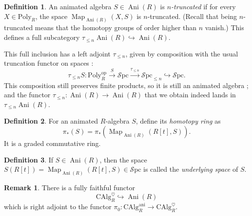 \documentclass[11pt]{article}
\theoremstyle{definition}
\newtheorem{definition}{Definition}
\newtheorem{remark}{Remark}
\newcommand{\Ani}{\operatorname{Ani}}
\newcommand{\ani}{\mathrm{ani}}
\newcommand{\CAlg}{\mathrm{CAlg}}
\newcommand{\heart}{\heartsuit}
\newcommand{\Map}{\operatorname{Map}}
\newcommand{\op}{\mathrm{op}}
\newcommand{\Poly}{\mathrm{Poly}}
\newcommand{\Spc}{\mathcal{S}\mathrm{pc}}
\begin{document}
\begin{definition}
    An animated algebra $S \in \Ani(R)$ is \emph{$n$-truncated} if for every $X \in \Poly_R$, the space $\Map_{\Ani(R)}(X, S)$ is $n$-truncated. (Recall that being $n$-truncated means that the homotopy groups of order higher than $n$ vanish.)
    This defines a full subcategory $\tau_{\leqslant n} \Ani(R) \hookrightarrow \Ani(R)$.
\end{definition}
This full inclusion has a left adjoint $\tau_{\leqslant n}$, given by composition with the usual truncation functor on spaces :
\[
    \tau_{\leqslant n} S : \Poly_R^{\op} \xrightarrow{S} \Spc \xrightarrow{\tau_{\leqslant n}} \Spc_{\leqslant n} \hookrightarrow \Spc.
\]
This composition still preserves finite products, so it is still an animated algebra ; and the functor $\tau_{\leqslant n} : \Ani(R) \to \Ani(R)$ that we obtain indeed lands in $\tau_{\leqslant n}\Ani(R)$.

\begin{definition}
    For an animated $R$-algebra $S$, define its \emph{homotopy ring} as
    \[
        \pi_*(S) = \pi_*(\Map_{\Ani(R)}(R[t], S)).
    \]
    It is a graded commutative ring.
\end{definition}

\begin{definition}
    If $S \in \Ani(R)$, then the space $S(R[t]) = \Map_{\Ani(R)}(R[t], S) \in \Spc$ is called the \emph{underlying space} of $S$.
\end{definition}

\begin{remark}
    There is a fully faithful functor
    \[
        \CAlg_R^{\heart} \hookrightarrow \Ani(R)
    \]
    which is right adjoint to the functor $\pi_0 : \CAlg_R^{\ani} \to \CAlg_R^{\heart}$.
\end{remark}
\end{document}
